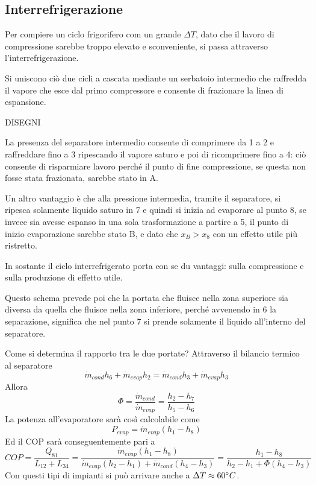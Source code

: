 \subsection{Interrefrigerazione}
\begin{adjustwidth}{2in}{}
	Per compiere un ciclo frigorifero com un grande $\Delta T$, dato che il lavoro di compressione sarebbe troppo elevato e sconveniente, si passa attraverso l'interrefrigerazione. 
	
	Si uniscono ciò due cicli a cascata mediante un serbatoio intermedio che raffredda il vapore che esce dal primo compressore e consente di frazionare la linea di espansione.
	
	DISEGNI
	
	La presenza del separatore intermedio consente di comprimere da 1 a 2 e raffreddare fino a 3 ripescando il vapore saturo e poi di ricomprimere fino a 4: ciò consente di risparmiare lavoro perché il punto di fine compressione, se questa non fosse stata frazionata, sarebbe stato in A.
	
	Un altro vantaggio è che alla pressione intermedia, tramite il separatore, si ripesca solamente liquido saturo in 7 e quindi si inizia ad evaporare al punto 8, se invece sia avesse espanso in una sola trasformazione a partire a 5, il punto di inizio evaporazione sarebbe stato B, e dato che $x_B>x_8$ con un effetto utile più ristretto. 
	
	In sostante il ciclo interrefrigerato porta con se du vantaggi: sulla compressione e sulla produzione di effetto utile. \newline 
	
	Questo schema prevede poi che la portata che fluisce nella zona superiore sia diversa da quella che fluisce nella zona inferiore, perché avvenendo in 6 la separazione, significa che nel punto 7 si prende solamente il liquido all'interno del separatore. 
	
	Come si determina il rapporto tra le due portate? Attraverso il bilancio termico al separatore
	\[\dot{m}_{cond}h_6 + \dot{m}_{evap}h_2 = \dot{m}_{cond}h_3 + \dot{m}_{evap}h_3 \]
	Allora 
	\[\Phi = \dfrac{\dot{m}_{cond}}{\dot{m}_{evap}} = \dfrac{h_2-h_7}{h_5-h_6}\]
	La potenza all'evaporatore sarà così calcolabile come 
	\[P_{evap} = \dot{m}_{evap}(h_1-h_8)\]
	Ed il COP sarà conseguentemente pari a 
	\[COP = \dfrac{Q_81}{L_{12}+L_{34}} = \dfrac{\dot{m}_{evap}(h_1-h_8)}{\dot{m}_{evap}(h_2-h_1) + \dot{m}_{cond}(h_4-h_3)} = \dfrac{h_1-h_8}{h_2-h_1 + \Phi(h_4-h_3)}\]
	Con questi tipi di impianti si può arrivare anche a $\Delta T \approx 60\degree C$.
\end{adjustwidth}





